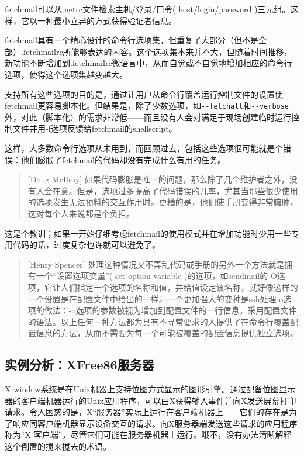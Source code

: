 \documentclass[12pt,oneside]{book}
\begin{document}
\begin{common-format}
fetchmail可以从.netrc文件检索主机/登录/口令( host/login/password )三元组。这样，它以一种最小立异的方式获得验证者信息。

fetchmail具有一个精心设计的命令行选项集，但重复了大部分（但不是全部）.fetchmailrc所能够表达的内容。这个选项集本来并不大，但随着时间推移，新功能不断增加到.fetchmailrc微语言中，从而自觉或不自觉地增加相应的命令行选项，使得这个选项集越变越大。

支持所有这些选项的目的是，通过让用户从命令行覆盖运行控制文件的设置使fetchmail更容易脚本化。但结果是，除了少数选项，如\verb+--fetchall+和\verb+--verbose+外，对此（脚本化）的需求非常低——而且没有人会对满足于现场创建临时运行控制文件并用-f选项反馈给fetchmail的shellscript。

这样，大多数命令行选项从未用到，而回顾过去，包括这些选项很可能就是个错误：他们膨胀了fetchmail的代码却没有完成什么有用的任务。

\begin{quote}[Doug McIlroy]
如果代码膨胀是唯一的问题，那么除了几个维护者之外，没有人会在意。但是，选项过多提高了代码错误的几率，尤其当那些很少使用的选项发生无法预料的交互作用时。更糟的是，他们使手册变得非常臃肿，这对每个人来说都是个负担。
\end{quote}

这是个教训；如果一开始仔细考虑fetchmail的使用模式并在增加功能时少用一些专用代码的话，过度复杂也许就可以避免了。

\begin{quote}[Henry Spencer]
处理这种情况又不弄乱代码或手册的另外一个方法就是拥有一个“设置选项变量”( set option variable )的选项，如sendmail的-O选项，它让人们指定一个选项的名称和值，并给值设定该名称，就好像这样的一个设置是在配置文件中给出的一样。一个更加强大的变种是ssh处理-o选项的做法：-o选项的参数被视为增加到配置文件的一行信息，采用配置文件的语法。以上任何一种方法都为具有不寻常要求的人提供了在命令行覆盖配置信息的方法，从而不需要为每一个可能被覆盖的配置信息提供独立选项。
\end{quote}


\subsection{实例分析：XFree86服务器}
X window系统是在Unix机器上支持位图方式显示的图形引擎。通过配备位图显示器的客户端机器运行的Unix应用程序，可以由X获得输入事件并向X发送屏幕打印请求。令人困惑的是，X“服务器”实际上运行在客户端机器上——它们的存在是为了响应同客户端机器显示设备交互的请求。向X服务器端发送这些请求的应用程序称为“X
客户端”，尽管它们可能在服务器机器上运行。哦不，没有办法清晰解释这个倒置的搅来搅去的术语。


\end{common-format}
\end{document}
